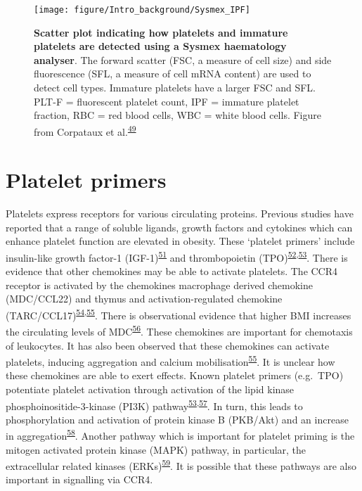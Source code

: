 \documentclass[11pt,twoside]{bristolthesis}
\begin{document}
\begin{figure}
\texttt{[image: figure/Intro\_background/Sysmex\_IPF]} \caption[Scatter plot indicating how platelets are immature platelets are detected using a Sysmex haematology analyser]{\textbf{Scatter plot indicating how platelets and immature platelets are detected using a Sysmex haematology analyser}. The forward scatter (FSC, a measure of cell size) and side fluorescence (SFL, a measure of cell mRNA content) are used to detect cell types. Immature platelets have a larger FSC and SFL. PLT-F = fluorescent platelet count, IPF = immature platelet fraction, RBC = red blood cells, WBC = white blood cells. Figure from Corpataux et al.\textsuperscript{\protect\hyperlink{ref-Corpataux2020}{49}}}\label{fig:sysmex-ipf}
\end{figure}
\hypertarget{platelet-primers}{%
\section{Platelet primers}\label{platelet-primers}}

Platelets express receptors for various circulating proteins. Previous studies have reported that a range of soluble ligands, growth factors and cytokines which can enhance platelet function are elevated in obesity. These `platelet primers' include insulin-like growth factor-1 (IGF-1)\textsuperscript{\protect\hyperlink{ref-Frystyk1995}{51}} and thrombopoietin (TPO)\textsuperscript{\protect\hyperlink{ref-Maury2010a}{52},\protect\hyperlink{ref-Blair2015}{53}}. There is evidence that other chemokines may be able to activate platelets. The CCR4 receptor is activated by the chemokines macrophage derived chemokine (MDC/CCL22) and thymus and activation-regulated chemokine (TARC/CCL17)\textsuperscript{\protect\hyperlink{ref-Kowalska2000}{54},\protect\hyperlink{ref-Abi-Younes2001}{55}}. There is observational evidence that higher BMI increases the circulating levels of MDC\textsuperscript{\protect\hyperlink{ref-Kitahara2014}{56}}. These chemokines are important for chemotaxis of leukocytes. It has also been observed that these chemokines can activate platelets, inducing aggregation and calcium mobilisation\textsuperscript{\protect\hyperlink{ref-Abi-Younes2001}{55}}. It is unclear how these chemokines are able to exert effects. Known platelet primers (e.g.~TPO) potentiate platelet activation through activation of the lipid kinase phosphoinositide-3-kinase (PI3K) pathway\textsuperscript{\protect\hyperlink{ref-Blair2015}{53},\protect\hyperlink{ref-Pasquet2000}{57}}. In turn, this leads to phosphorylation and activation of protein kinase B (PKB/Akt) and an increase in aggregation\textsuperscript{\protect\hyperlink{ref-Hemmings2015}{58}}. Another pathway which is important for platelet priming is the mitogen activated protein kinase (MAPK) pathway, in particular, the extracellular related kinases (ERKs)\textsuperscript{\protect\hyperlink{ref-Ezumi1998}{59}}. It is possible that these pathways are also important in signalling via CCR4.
\end{document}
